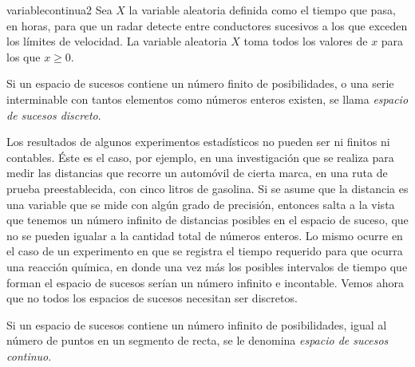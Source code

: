 \begin{examplebox}{}{variablecontinua2}
    Sea $X$ la variable aleatoria definida como el tiempo que pasa, en horas, para que un radar detecte entre conductores sucesivos a los que exceden los límites de velocidad. La variable aleatoria $X$ toma todos los valores de $x$ para los que $x \geq 0$.
\end{examplebox}

\begin{definicion}{}{}
    Si un espacio de sucesos contiene un número finito de posibilidades, o una serie interminable con tantos elementos como números enteros existen, se llama \emph{espacio de sucesos discreto}.
\end{definicion}

Los resultados de algunos experimentos estadísticos no pueden ser ni finitos ni contables. Éste es el caso, por ejemplo, en una investigación que se realiza para medir las distancias que recorre un automóvil de cierta marca, en una ruta de prueba preestablecida, con cinco litros de gasolina. Si se asume que la distancia es una variable que se mide con algún grado de precisión, entonces salta a la vista que tenemos un número infinito de distancias posibles en el espacio de suceso, que no se pueden igualar a la cantidad total de números enteros. Lo mismo ocurre en el caso de un experimento en que se registra el tiempo requerido para que ocurra una reacción química, en donde una vez más los posibles intervalos de tiempo que forman el espacio de sucesos serían un número infinito e incontable. Vemos ahora que no todos los espacios de sucesos necesitan ser discretos.

\begin{definicion}{}{}
    Si un espacio de sucesos contiene un número infinito de posibilidades, igual al número de puntos en un segmento de recta, se le denomina \emph{espacio de sucesos continuo}.
\end{definicion}

